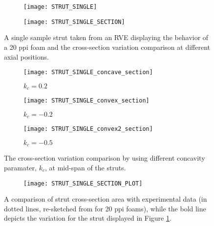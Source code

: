 \begin{figure}
	\centering
	\begin{subfigure}[b]{0.45\textwidth}
		\texttt{[image: STRUT\_SINGLE]}
	\end{subfigure}
	\begin{subfigure}[b]{0.45\textwidth}
		\texttt{[image: STRUT\_SINGLE\_SECTION]}
	\end{subfigure}
	\caption{A single sample strut taken from an RVE displaying the behavior of a 20 ppi foam and the cross-section variation comparison at different axial positions.}\label{strut_section}
\end{figure}

\begin{figure}
	\centering
	\begin{subfigure}[b]{0.32\textwidth}
		\texttt{[image: STRUT\_SINGLE\_concave\_section]}
		\caption{{$ k_c = 0.2$}}
	\end{subfigure}
	\begin{subfigure}[b]{0.32\textwidth}
		\texttt{[image: STRUT\_SINGLE\_convex\_section]}
		\caption{{$ k_c = -0.2$}}
	\end{subfigure}
	\begin{subfigure}[b]{0.32\textwidth}
		\texttt{[image: STRUT\_SINGLE\_convex2\_section]}
		\caption{{$ k_c = -0.5$}}
	\end{subfigure}
	\caption{{The cross-section variation comparison by using different concavity paramater, $ k_c $, at mid-span of the struts.}}\label{strut_section_variation}
\end{figure}

\begin{figure}
	\centering
	\begin{subfigure}[b]{0.35\textwidth}
\texttt{[image: STRUT\_SINGLE\_SECTION\_PLOT]}
	\end{subfigure}
	\caption{A comparison of strut cross-section area with experimental data (in dotted lines, re-sketched from \cite{jungMicrostructuralCharacterisationExperimental2017} for 20 ppi foams), while the bold line depicts the variation for the strut displayed in Figure \ref{strut_section}.}\label{strut_section_plot}
\end{figure}

